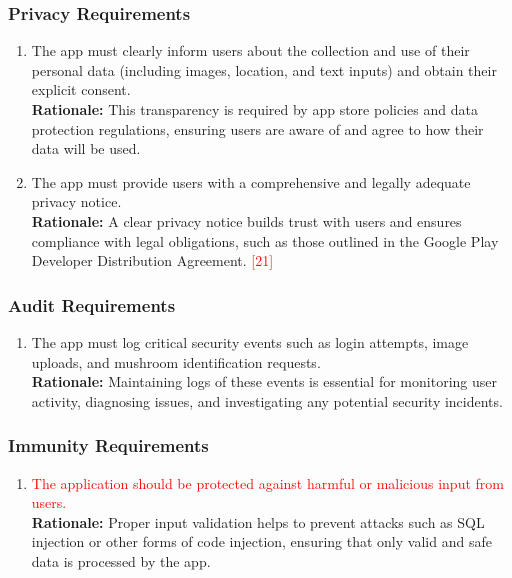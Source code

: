 \documentclass{article}
\begin{document}
\subsubsection{Privacy Requirements}
\label{ssub:privacy_requirements}
\begin{enumerate}[{SR-P}1. ]
	\item The app must clearly inform users about the collection and use of their personal data (including images, location, and text inputs) and obtain their explicit consent.\\
	\textbf{Rationale:} This transparency is required by app store policies and data protection regulations, ensuring users are aware of and agree to how their data will be used.
	\item The app must provide users with a comprehensive and legally adequate privacy notice.\\
	\textbf{Rationale:} A clear privacy notice builds trust with users and ensures compliance with legal obligations, such as those outlined in the Google Play Developer Distribution Agreement. \textcolor{red}{[21]}
\end{enumerate}

\subsubsection{Audit Requirements}
\label{ssub:audit_requirements}
\begin{enumerate}[{SR-AU}1. ]
	\item The app must log critical security events such as login attempts, image uploads, and mushroom identification requests.\\
	\textbf{Rationale:} Maintaining logs of these events is essential for monitoring user activity, diagnosing issues, and investigating any potential security incidents.
\end{enumerate}

\subsubsection{Immunity Requirements}
\label{ssub:immunity_requirements}
\begin{enumerate}[{SR-IM}1. ]
	\item \textcolor{red}{The application should be protected against harmful or malicious input from users.}\\
	\textbf{Rationale:} Proper input validation helps to prevent attacks such as SQL injection or other forms of code injection, ensuring that only valid and safe data is processed by the app.
\end{enumerate}
\end{document}
